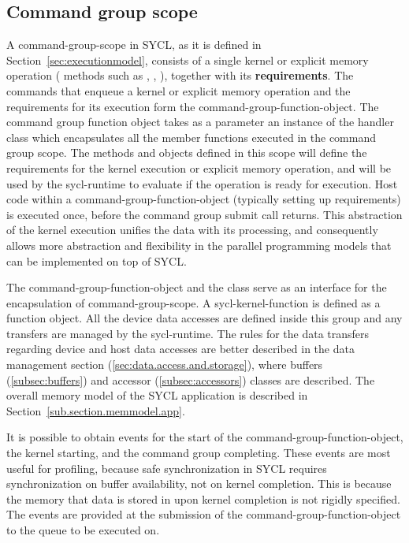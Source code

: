 \subsection{Command group scope}
\label{sec:command.group.scope}

A \gls{command-group-scope} in SYCL, as it is defined in 
Section~\ref{sec:executionmodel}, consists of a single kernel or explicit memory
operation ( methods such as , ,
), together with its \textbf{requirements}.
The commands that enqueue a kernel or explicit memory operation and the requirements
for its execution form the \gls{command-group-function-object}.
The command group
function object takes as a parameter an instance of the \gls{handler} class which 
encapsulates all the member functions executed in the command group scope. 
The methods and objects defined in this scope will define the requirements for the
kernel execution or explicit memory operation, and will be used by the \gls{sycl-runtime}
to evaluate if the operation is ready for execution.
Host code within a \gls{command-group-function-object} (typically setting up
requirements) is executed once, before the command group submit call returns.
This abstraction of the kernel
execution unifies the data with its processing, and consequently allows more
abstraction and flexibility in the parallel programming models that can be
implemented on top of SYCL.

The \gls{command-group-function-object} and the  class
serve as an interface for the encapsulation of \gls{command-group-scope}.
A \gls{sycl-kernel-function} is defined as a function object. All the device data accesses are
defined inside this group and any transfers are managed by the \gls{sycl-runtime}. The
rules for the data transfers regarding device and
host data accesses are better described in the data management section
(\ref{sec:data.access.and.storage}), where buffers (\ref{subsec:buffers}) and
accessor (\ref{subsec:accessors}) classes are described.
The overall memory model of the SYCL application is described in
Section~\ref{sub.section.memmodel.app}.

It is possible to obtain events for the start of the \gls{command-group-function-object},
the kernel starting, and the command group completing.
These events are most useful for
profiling, because safe synchronization in SYCL requires synchronization on
buffer availability, not on kernel completion. This is because
the memory that data is stored in upon kernel
completion is not rigidly specified. The events are provided at the submission of the
\gls{command-group-function-object} to the queue to be executed on.


